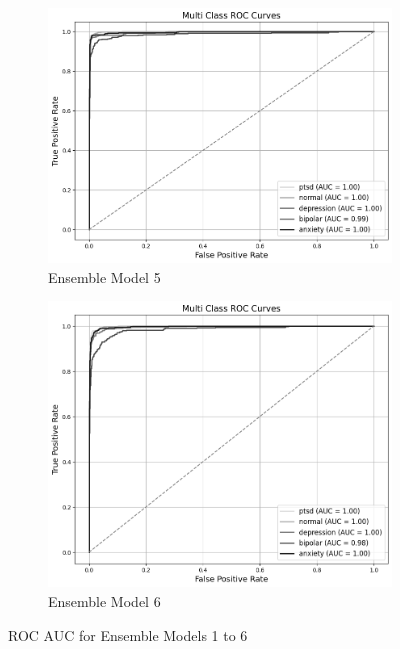 \begin{figure}[H]
    \hfill
    \begin{subfigure}[b]{0.48\textwidth}
        \centering
        \includegraphics[width=\textwidth]{Images/BLD ROC.png}
        \caption{Ensemble Model 5}
        \label{bld roc}  %
    \end{subfigure}
    \hfill
    \begin{subfigure}[b]{0.48\textwidth}
        \centering
        \includegraphics[width=\textwidth]{Images/WV ROC.png}
        \caption{Ensemble Model 6}
        \label{wv roc}  %
    \end{subfigure}
    \label{fig:ensemble_model_comparison}
    \caption{ROC AUC for Ensemble Models 1 to 6}
\end{figure}

